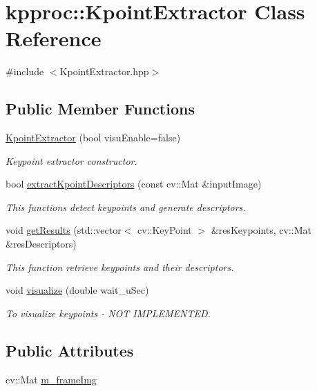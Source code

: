 \hypertarget{classkpproc_1_1KpointExtractor}{}\section{kpproc\+:\+:Kpoint\+Extractor Class Reference}
\label{classkpproc_1_1KpointExtractor}


{\ttfamily \#include $<$Kpoint\+Extractor.\+hpp$>$}

\subsection*{Public Member Functions}
\begin{DoxyCompactItemize}
\item 
\hyperlink{classkpproc_1_1KpointExtractor_ad05a95e4da00ee5d14a4c1b99141cd08}{Kpoint\+Extractor} (bool visu\+Enable=false)
\begin{DoxyCompactList}\small\item\em Keypoint extractor constructor. \end{DoxyCompactList}\item 
bool \hyperlink{classkpproc_1_1KpointExtractor_ade1efa4e540390775ed7158f57ca9618}{extract\+Kpoint\+Descriptors} (const cv\+::\+Mat \&input\+Image)
\begin{DoxyCompactList}\small\item\em This functions detect keypoints and generate descriptors. \end{DoxyCompactList}\item 
void \hyperlink{classkpproc_1_1KpointExtractor_a167e3596663206cb24e9eefe54baf4be}{get\+Results} (std\+::vector$<$ cv\+::\+Key\+Point $>$ \&res\+Keypoints, cv\+::\+Mat \&res\+Descriptors)
\begin{DoxyCompactList}\small\item\em This function retrieve keypoints and their descriptors. \end{DoxyCompactList}\item 
void \hyperlink{classkpproc_1_1KpointExtractor_a52e3033d4c95115f76315c228d3a1350}{visualize} (double wait\+\_\+u\+Sec)
\begin{DoxyCompactList}\small\item\em To visualize keypoints -\/ N\+OT I\+M\+P\+L\+E\+M\+E\+N\+T\+ED. \end{DoxyCompactList}\end{DoxyCompactItemize}
\subsection*{Public Attributes}
\begin{DoxyCompactItemize}
\item 
cv\+::\+Mat \hyperlink{classkpproc_1_1KpointExtractor_ac03e195051022be4aab2a008d05475c4}{m\+\_\+frame\+Img}
\end{DoxyCompactItemize}
